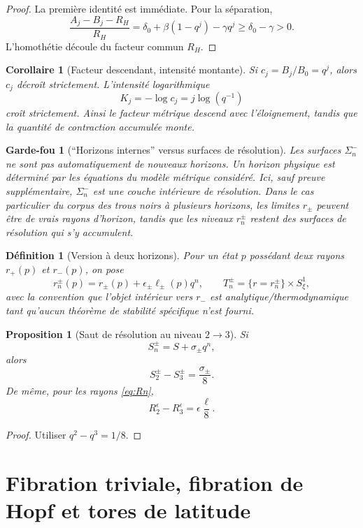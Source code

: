 \documentclass[11pt,a4paper]{article}
\newtheorem{proposition}[theorem]{Proposition}
\newtheorem{corollary}[theorem]{Corollaire}
\newtheorem{definition}[theorem]{Définition}
\newtheorem{guardrail}[theorem]{Garde-fou}
\begin{document}
\begin{proof}
La première identité est immédiate. Pour la séparation,
\[
 \frac{A_j-B_j-R_H}{R_H}
 =\delta_0+\beta(1-q^j)-\gamma q^j
 \ge \delta_0-\gamma>0.
\]
L'homothétie découle du facteur commun $R_H$.
\end{proof}

\begin{corollary}[Facteur descendant, intensité montante]
Si $c_j=B_j/B_0=q^j$, alors $c_j$ décroît strictement. L'intensité logarithmique
\[
 K_j=-\log c_j=j\log(q^{-1})
\]
croît strictement. Ainsi le \emph{facteur métrique} descend avec l'éloignement, tandis que la \emph{quantité de contraction accumulée} monte.
\end{corollary}

\begin{guardrail}[``Horizons internes'' versus surfaces de résolution]
Les surfaces $\Sigma_n^-$ ne sont pas automatiquement de nouveaux horizons. Un horizon physique est déterminé par les équations du modèle métrique considéré. Ici, sauf preuve supplémentaire, $\Sigma_n^-$ est une couche intérieure de résolution. Dans le cas particulier du corpus des trous noirs à plusieurs horizons, les limites $r_\pm$ peuvent être de vrais rayons d'horizon, tandis que les niveaux $r_n^\pm$ restent des surfaces de résolution qui s'y accumulent.
\end{guardrail}

\begin{definition}[Version à deux horizons]
Pour un état $p$ possédant deux rayons $r_+(p)$ et $r_-(p)$, on pose
\[
 r_n^\pm(p)=r_\pm(p)+\epsilon_\pm\ell_\pm(p)q^n,
\qquad
 T_n^\pm=\{r=r_n^\pm\}\times S^1_\xi,
\]
avec la convention que l'objet intérieur vers $r_-$ est analytique/thermodynamique tant qu'aucun théorème de stabilité spécifique n'est fourni.
\end{definition}

\begin{proposition}[Saut de résolution au niveau $2\to3$]
Si
\[
 S_n^\pm=S+\sigma_\pm q^n,
\]
alors
\[
 S_2^\pm-S_3^\pm=\frac{\sigma_\pm}{8}.
\]
De même, pour les rayons \eqref{eq:Rn},
\[
 R_2^\epsilon-R_3^\epsilon=\epsilon\frac{\ell}{8}.
\]
\end{proposition}

\begin{proof}
Utiliser $q^2-q^3=1/8$.
\end{proof}

\section{Fibration triviale, fibration de Hopf et tores de latitude}
\end{document}
